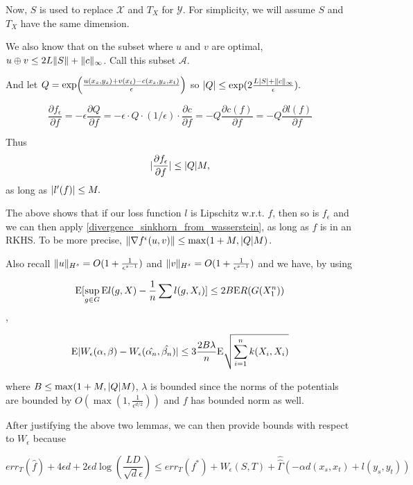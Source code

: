 Now, $S$ is used to replace $\mathcal{X}$ and $T_X$ for $\mathcal{Y}$. For simplicity, we will assume $S$ and $T_X$ have the same dimension.

We also know that on the subset where $u$ and $v$ are optimal, $u\oplus v\leq 2L\lVert S\rVert+\lVert c\rVert_{\infty}$. Call this subset $\mathcal{A}$.

And let $Q=\exp \paren*{\frac{u(x_s,y_s)+v(x_t)-c(x_s,y_s,x_t)}{\epsilon}}$ so $\lvert Q\rvert\leq \exp(2\frac{L\lvert S\rvert+\lVert c\rVert_{\infty}}{\epsilon}).$

$$\frac{\partial f_{\epsilon}}{\partial f} = -\epsilon \frac{\partial Q}{\partial f} = -\epsilon \cdot Q \cdot (1/\epsilon) \cdot \frac{\partial c}{\partial f} = -Q \frac{\partial c(f)}{\partial f} = -Q \frac{\partial l(f)}{\partial f}$$

Thus $$\lvert\frac{\partial f_{\epsilon}}{\partial f}\rvert\leq \lvert Q\rvert M,$$ as long as $\lvert l'(f)\rvert \leq M.$

The above shows that if our loss function $l$ is Lipschitz w.r.t. $f$, then so is $f_{\epsilon}$ and we can then apply \ref{divergence_sinkhorn_from_wasserstein}, as long as $f$ is in an RKHS. To be more precise, $\lVert\nabla f^{\epsilon}(u,v)\rVert\leq \max(1+M,\lvert Q\rvert M)$.

Also recall $\lVert u\rVert_{H^s}=O(1+\frac{1}{\epsilon^{s-1}})$ and $\lVert v\rVert_{H^s}=O(1+\frac{1}{\epsilon^{s-1}})$ and we have, by using

$$ \mathrm{E} [\sup_{g\in G} \mathrm{E} l(g,X) - \frac{1}{n} \sum l(g,X_i)] \leq 2B\mathrm{E} R(G(X_1^n)) $$,

$$ \mathrm{E} \lvert W_{\epsilon}(\alpha,\beta) - W_{\epsilon}(\hat{\alpha_n},\hat{\beta_n})\rvert \leq 3 \frac{2B\lambda}{n} \mathrm{E} \sqrt{\sum_{i=1}^n k(X_i,X_i)} $$

where $B\leq \max(1+M,\lvert Q\rvert M)$, $\lambda$ is bounded since the norms of the potentials are bounded by $O(\max(1,\frac{1}{\epsilon^{d/2}}))$ and $f$ has bounded norm as well.


After justifying the above two lemmas, we can then provide bounds with respect to $W_{\epsilon}$ because

$$err_{T}(\hat{f}) + 4\epsilon d + 2\epsilon d \log(\frac{LD}{\sqrt{d}\epsilon}) \leq err_{T}(f^{*})+W_{\epsilon}(S,T)+\hat{\hat{\Gamma}}\left(-\alpha
d(x_{s},x_{t})+l(y_{s},y_{t})\right)$$

